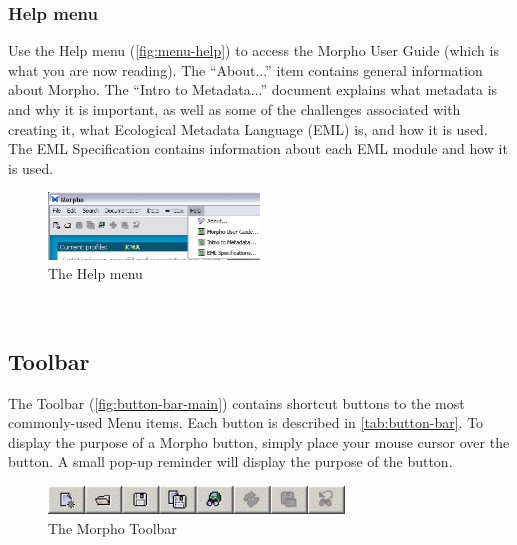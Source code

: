 \subsubsection{Help menu} \label{sec:menu-help}

Use the Help menu (\autoref{fig:menu-help}) to access the Morpho User
Guide (which is what you are now reading). The ``About...'' item
contains general information about Morpho. The ``Intro to Metadata...''
document explains what metadata is and why it is important, as well as
some of the challenges associated with creating it, what Ecological
Metadata Language (EML) is, and how it is used. The EML Specification
contains information about each EML module and how it is used.

\begin{figure}
  \centering
    \includegraphics[width=0.5\textwidth]{images/menu-help.jpg}
  \caption{The Help menu}
  \label{fig:menu-help}
\end{figure}
 

\subsection{Toolbar} \label{sec:toolbar}

The Toolbar (\autoref{fig:button-bar-main}) contains shortcut buttons to the
most commonly-used Menu items. Each button is described in
\autoref{tab:button-bar}. To display the purpose of a Morpho button,
simply place your mouse cursor over the button. A small pop-up reminder
will display the purpose of the button.

\begin{figure}
  \centering
    \includegraphics[width=0.7\textwidth]{images/button-bar-main.png}
  \caption{The Morpho Toolbar}
  \label{fig:button-bar-main}
\end{figure}
 
